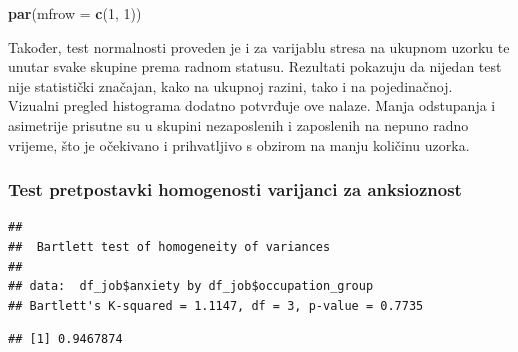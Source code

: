 \documentclass[
]{article}
\newenvironment{Shaded}{\begin{snugshade}}{\end{snugshade}}
\newcommand{\AttributeTok}[1]{\textcolor[rgb]{0.13,0.29,0.53}{#1}}
\newcommand{\DecValTok}[1]{\textcolor[rgb]{0.00,0.00,0.81}{#1}}
\newcommand{\FunctionTok}[1]{\textcolor[rgb]{0.13,0.29,0.53}{\textbf{#1}}}
\newcommand{\NormalTok}[1]{#1}
\newcommand{\SpecialCharTok}[1]{\textcolor[rgb]{0.81,0.36,0.00}{\textbf{#1}}}
\newcommand{\StringTok}[1]{\textcolor[rgb]{0.31,0.60,0.02}{#1}}
\begin{document}
\begin{Shaded}
\begin{Highlighting}[]
\FunctionTok{par}\NormalTok{(}\AttributeTok{mfrow =} \FunctionTok{c}\NormalTok{(}\DecValTok{1}\NormalTok{, }\DecValTok{1}\NormalTok{))}
\end{Highlighting}
\end{Shaded}

Također, test normalnosti proveden je i za varijablu stresa na ukupnom
uzorku te unutar svake skupine prema radnom statusu. Rezultati pokazuju
da nijedan test nije statistički značajan, kako na ukupnoj razini, tako
i na pojedinačnoj.\\
Vizualni pregled histograma dodatno potvrđuje ove nalaze. Manja
odstupanja i asimetrije prisutne su u skupini nezaposlenih i zaposlenih
na nepuno radno vrijeme, što je očekivano i prihvatljivo s obzirom na
manju količinu uzorka.

\subsubsection{Test pretpostavki homogenosti varijanci za
anksioznost}\label{test-pretpostavki-homogenosti-varijanci-za-anksioznost}

\begin{Shaded}
\end{Shaded}

\begin{verbatim}
## 
##  Bartlett test of homogeneity of variances
## 
## data:  df_job$anxiety by df_job$occupation_group
## Bartlett's K-squared = 1.1147, df = 3, p-value = 0.7735
\end{verbatim}

\begin{Shaded}
\end{Shaded}

\begin{verbatim}
## [1] 0.9467874
\end{verbatim}
\end{document}

